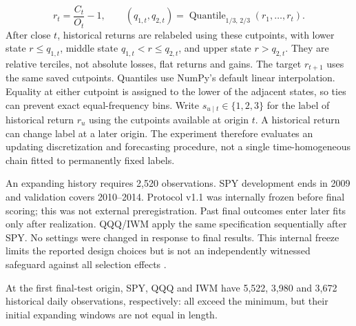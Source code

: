 \begin{equation}
r_t=\frac{C_t}{O_t}-1,\qquad
(q_{1,t},q_{2,t})=\operatorname{Quantile}_{1/3,\,2/3}(r_1,\ldots,r_t).
\label{eq:returns}
\end{equation}
After close $t$, historical returns are relabeled using these cutpoints, with lower state $r\le q_{1,t}$, middle state $q_{1,t}<r\le q_{2,t}$, and upper state $r>q_{2,t}$. They are relative terciles, not absolute losses, flat returns and gains. The target $r_{t+1}$ uses the same saved cutpoints. Quantiles use NumPy's default linear interpolation. Equality at either cutpoint is assigned to the lower of the adjacent states, so ties can prevent exact equal-frequency bins. Write $s_{u\mid t}\in\{1,2,3\}$ for the label of historical return $r_u$ using the cutpoints available at origin $t$. A historical return can change label at a later origin. The experiment therefore evaluates an updating discretization and forecasting procedure, not a single time-homogeneous chain fitted to permanently fixed labels.

An expanding history requires 2,520 observations. SPY development ends in 2009 and validation covers 2010--2014. Protocol v1.1 was internally frozen before final scoring; this was not external preregistration. Past final outcomes enter later fits only after realization. QQQ/IWM apply the same specification sequentially after SPY. No settings were changed in response to final results. This internal freeze limits the reported design choices but is not an independently witnessed safeguard against all selection effects \citep{White2000,Bailey2014}.

At the first final-test origin, SPY, QQQ and IWM have 5,522, 3,980 and 3,672 historical daily observations, respectively: all exceed the minimum, but their initial expanding windows are not equal in length.

